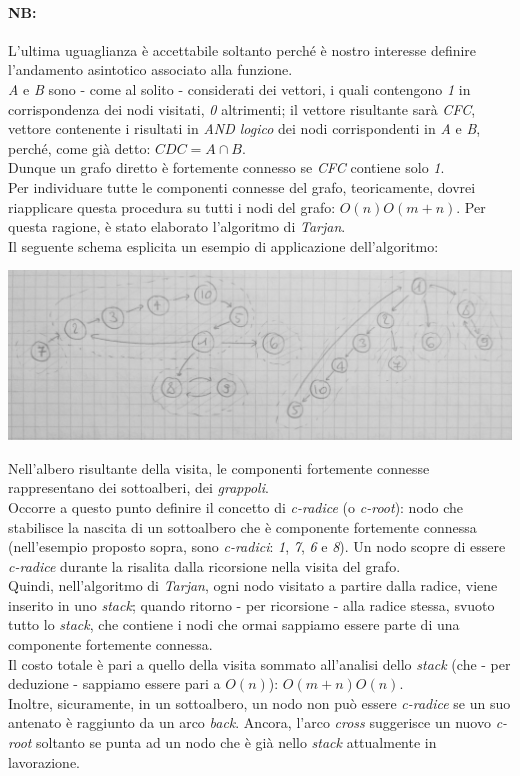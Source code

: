 \paragraph{NB:}
L'ultima uguaglianza è accettabile soltanto perché è nostro interesse definire l'andamento asintotico associato alla funzione. \\
\textit{A} e \textit{B} sono - come al solito - considerati dei vettori, i quali contengono \textit{1} in corrispondenza dei nodi visitati, \textit{0} altrimenti; il vettore risultante sarà \textit{CFC}, vettore contenente i risultati in \textit{AND logico} dei nodi corrispondenti in \textit{A} e \textit{B}, perché, come già detto: $ CDC = A\cap B $. \\
Dunque un grafo diretto è fortemente connesso se \textit{CFC} contiene solo \textit{1}. \\
\newpage
Per individuare tutte le componenti connesse del grafo, teoricamente, dovrei riapplicare questa procedura su tutti i nodi del grafo: $ O(n)O(m+n) $.
Per questa ragione, è stato elaborato l'algoritmo di \textit{Tarjan}. \\
Il seguente schema esplicita un esempio di applicazione dell'algoritmo:
\begin{center}
    \includegraphics[width=.9\textwidth]{res/tarjan-grafo-albero.jpg} \hfill
\end{center}
Nell'albero risultante della visita, le componenti fortemente connesse rappresentano dei sottoalberi, dei \textit{grappoli}. \\
Occorre a questo punto definire il concetto di \textit{c-radice} (o \textit{c-root}): nodo che stabilisce la nascita di un sottoalbero che è componente fortemente connessa (nell'esempio proposto sopra, sono \textit{c-radici}: \textit{1}, \textit{7}, \textit{6} e \textit{8}).
Un nodo scopre di essere \textit{c-radice} durante la risalita dalla ricorsione nella visita del grafo. \\
Quindi, nell'algoritmo di \textit{Tarjan}, ogni nodo visitato a partire dalla radice, viene inserito in uno \textit{stack}; quando ritorno - per ricorsione - alla radice stessa, svuoto tutto lo \textit{stack}, che contiene i nodi che ormai sappiamo essere parte di una componente fortemente connessa. \\
Il costo totale è pari a quello della visita sommato all'analisi dello \textit{stack} (che - per deduzione -  sappiamo essere pari a $ O(n) $): $ O(m+n)O(n) $. \\
Inoltre, sicuramente, in un sottoalbero, un nodo non può essere \textit{c-radice} se un suo antenato è raggiunto da un arco \textit{back}. Ancora, l'arco \textit{cross} suggerisce un nuovo \textit{c-root} soltanto se punta ad un nodo che è già nello \textit{stack} attualmente in lavorazione.

